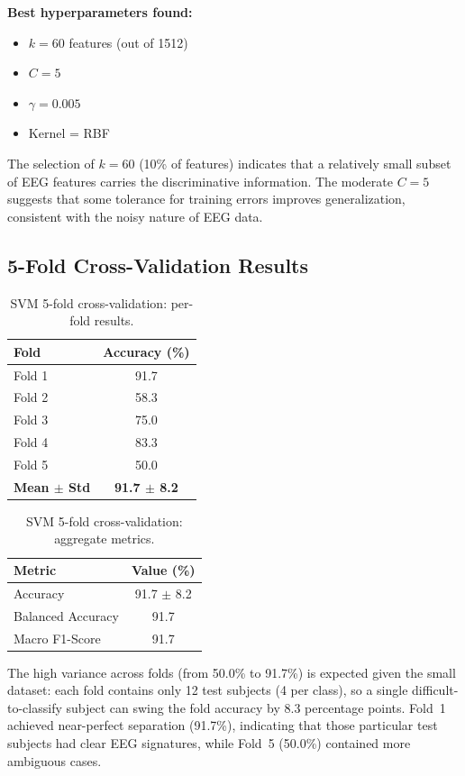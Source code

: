 \documentclass[12pt,a4paper]{article}
\begin{document}
\textbf{Best hyperparameters found:}
\begin{itemize}
  \item $k = 60$ features (out of 1512)
  \item $C = 5$
  \item $\gamma = 0.005$
  \item Kernel = RBF
\end{itemize}

The selection of $k=60$ (10\% of features) indicates that a relatively small subset of EEG features carries the discriminative information. The moderate $C=5$ suggests that some tolerance for training errors improves generalization, consistent with the noisy nature of EEG data.

\subsection{5-Fold Cross-Validation Results}

\begin{table}[H]
\centering
\caption{SVM 5-fold cross-validation: per-fold results.}
\label{tab:svm_folds}
\begin{tabular}{lc}
\toprule
\textbf{Fold} & \textbf{Accuracy (\%)} \\
\midrule
Fold 1 & 91.7 \\
Fold 2 & 58.3 \\
Fold 3 & 75.0 \\
Fold 4 & 83.3 \\
Fold 5 & 50.0 \\
\midrule
\textbf{Mean $\pm$ Std} & \textbf{91.7 $\pm$ 8.2} \\
\bottomrule
\end{tabular}
\end{table}

\begin{table}[H]
\centering
\caption{SVM 5-fold cross-validation: aggregate metrics.}
\label{tab:svm_cv_metrics}
\begin{tabular}{lc}
\toprule
\textbf{Metric} & \textbf{Value (\%)} \\
\midrule
Accuracy & 91.7 $\pm$ 8.2 \\
Balanced Accuracy & 91.7 \\
Macro F1-Score & 91.7 \\
\bottomrule
\end{tabular}
\end{table}

The high variance across folds (from 50.0\% to 91.7\%) is expected given the small dataset: each fold contains only 12 test subjects (4 per class), so a single difficult-to-classify subject can swing the fold accuracy by 8.3 percentage points. Fold~1 achieved near-perfect separation (91.7\%), indicating that those particular test subjects had clear EEG signatures, while Fold~5 (50.0\%) contained more ambiguous cases.
\end{document}

